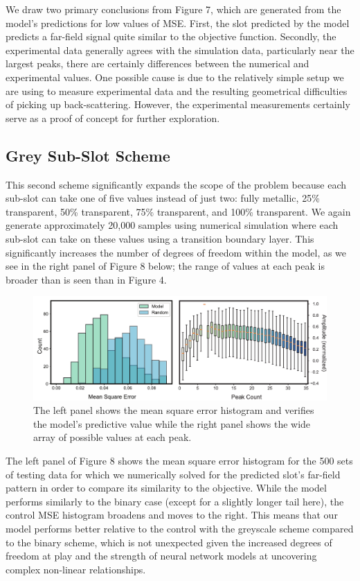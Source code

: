 \documentclass[11pt]{article}
\begin{document}
\noindent We draw two primary conclusions from Figure 7, which are generated from the model's predictions for low values of MSE. First, the slot predicted by the model predicts a far-field signal quite similar to the objective function. Secondly, the experimental data generally agrees with the simulation data, particularly near the largest peaks, there are certainly differences between the numerical and experimental values. One possible cause is due to the relatively simple setup we are using to measure experimental data and the resulting geometrical difficulties of picking up back-scattering. However, the experimental measurements certainly serve as a proof of concept for further exploration.

\subsection*{Grey Sub-Slot Scheme}

\noindent This second scheme significantly expands the scope of the problem because each sub-slot can take one of five values instead of just two: fully metallic, 25\% transparent, 50\% transparent, 75\% transparent, and 100\% transparent. We again generate approximately 20,000 samples using numerical simulation where each sub-slot can take on these values using a transition boundary layer. This significantly increases the number of degrees of freedom within the model, as we see in the right panel of Figure 8 below; the range of values at each peak is broader than is seen than in Figure 4.

\begin{figure}[H]
	\includegraphics[width=6.5in]{figures/histboxgreypdf}
		\caption{The left panel shows the mean square error histogram and verifies the model's predictive value while the right panel shows the wide array of possible values at each peak.}
\end{figure}

\noindent The left panel of Figure 8 shows the mean square error histogram for the 500 sets of testing data for which we numerically solved for the predicted slot's far-field pattern in order to compare its similarity to the objective. While the model performs similarly to the binary case (except for a slightly longer tail here), the control MSE histogram broadens and moves to the right. This means that our model performs better relative to the control with the greyscale scheme compared to the binary scheme, which is not unexpected given the increased degrees of freedom at play and the strength of neural network models at uncovering complex non-linear relationships.  \\
\end{document}
